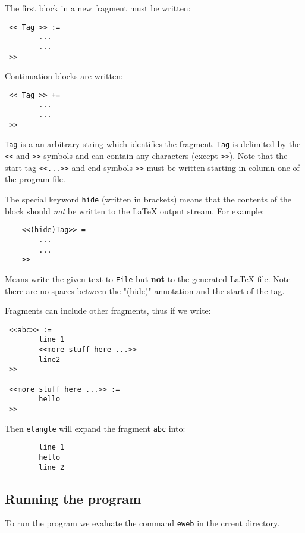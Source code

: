 The first block in a new fragment must be written:

\begin{verbatim}
 << Tag >> :=
        ... 
        ...
 >>
\end{verbatim}

Continuation blocks are written:

\begin{verbatim}
 << Tag >> +=
        ...
        ...
 >>
\end{verbatim}

  \verb+Tag+  is a an  arbitrary string which identifies the fragment.
\verb+Tag+ is delimited by the \verb+<<+ and \verb+>>+ symbols and can
contain any characters  (except  \verb+>>+). Note  that  the start tag
\verb+<<...>>+  and end symbols \verb+>>+  must be written starting in
column one of the program file.

    The special keyword \verb+hide+ (written in brackets) means that the
contents of the block should {\sl not\/} be written to the \LaTeX{}
output stream. For example:

\begin{verbatim}
    <<(hide)Tag>> =
        ...
        ...
    >>
\end{verbatim}

Means write the given text to \verb+File+ but {\bf not} to the generated
\LaTeX{} file. Note there are no spaces between the "(hide)" annotation
and the start of the tag.

Fragments can include other fragments, thus if we write:

\begin{verbatim}
 <<abc>> :=
        line 1
        <<more stuff here ...>>
        line2
 >>

 <<more stuff here ...>> :=
        hello
 >>
\end{verbatim}

Then \verb+etangle+ will expand the fragment \verb+abc+ into:

\begin{verbatim}
        line 1
        hello
        line 2
\end{verbatim}


\subsection*{Running the program}

  To run the program we evaluate the command \verb+eweb+ in the crrent
directory.

